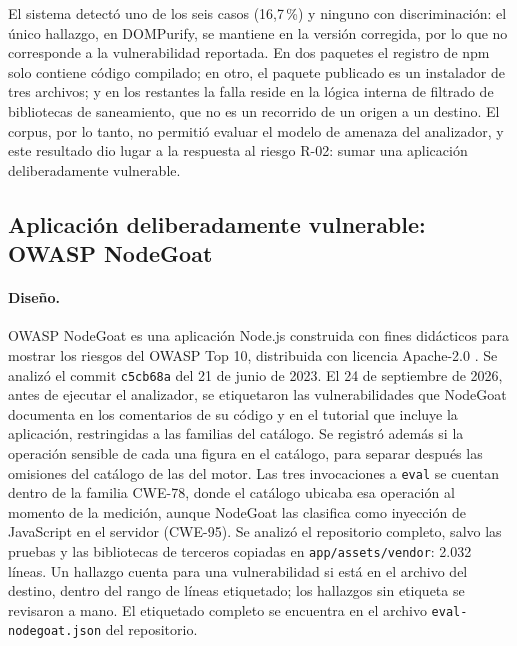 El sistema detectó uno de los seis casos (16,7\,\%) y ninguno con
discriminación: el único hallazgo, en DOMPurify, se mantiene en la
versión corregida, por lo que no corresponde a la vulnerabilidad
reportada. En dos paquetes el registro de npm solo contiene código
compilado; en otro, el paquete publicado es un instalador de tres
archivos; y en los restantes la falla reside en la lógica interna de
filtrado de bibliotecas de saneamiento, que no es un recorrido de un
origen a un destino. El corpus, por lo tanto, no permitió evaluar el
modelo de amenaza del analizador, y este resultado dio lugar a la
respuesta al riesgo R-02: sumar una aplicación deliberadamente
vulnerable.

\subsection{Aplicación deliberadamente vulnerable: OWASP NodeGoat}\label{sec:nodegoat}

\paragraph{Diseño.} OWASP NodeGoat es una aplicación Node.js construida
con fines didácticos para mostrar los riesgos del OWASP Top 10,
distribuida con licencia Apache-2.0 \citep{nodegoat}. Se analizó el
commit \texttt{c5cb68a} del 21 de junio de 2023. El 24 de septiembre de
2026, antes de ejecutar el analizador, se etiquetaron las
vulnerabilidades que NodeGoat documenta en los comentarios de su código y
en el tutorial que incluye la aplicación, restringidas a las familias del
catálogo. Se registró además si la operación sensible de cada una figura
en el catálogo, para separar después las omisiones del catálogo de las
del motor. Las tres invocaciones a \texttt{eval} se cuentan dentro de la
familia CWE-78, donde el catálogo ubicaba esa operación al momento de la
medición, aunque NodeGoat las clasifica como inyección de JavaScript en
el servidor (CWE-95). Se
analizó el repositorio completo, salvo las pruebas y las bibliotecas de
terceros copiadas en \texttt{app/assets/vendor}: 2.032 líneas. Un
hallazgo cuenta para una vulnerabilidad si está en el archivo del
destino, dentro del rango de líneas etiquetado; los hallazgos sin
etiqueta se revisaron a mano. El etiquetado completo se encuentra en el
archivo \texttt{eval-nodegoat.json} del repositorio.

